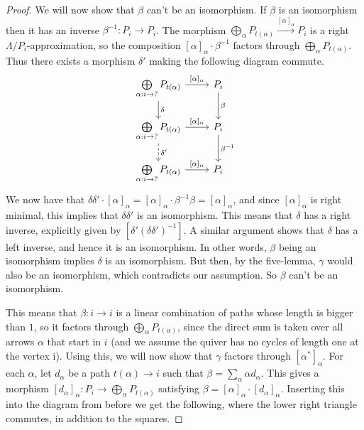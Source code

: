 \documentclass[12pt, dvipsnames, oneside]{amsart}
\theoremstyle{definition}
\begin{document}
\begin{proof}
We will now show that $\beta$ can't be an isomorphism. If $\beta$ is an isomorphism then it has an inverse $\beta^{-1}\colon P_i\rightarrow P_i$.
The morphism $\bigoplus_{\alpha}P_{t(\alpha)} \xrightarrow{[\alpha]_{\alpha}} P_i$ is a right $\Lambda/P_i$-approximation, so the composition $[\alpha]_\alpha\cdot\beta^{-1}$ factors through $\bigoplus_{\alpha}P_{t(\alpha)}$. Thus there exists a morphism $\delta'$ making the following diagram commute.
\begin{equation*}
\begin{tikzcd}
\bigoplus\limits_{\alpha:i\rightarrow ?}P_{t(\alpha)}  \arrow[r, "{[\alpha]_{\alpha}}"] \arrow[d, "{\delta}"] & P_i \arrow[d, "{\beta}"] \\
\bigoplus\limits_{\alpha:i\rightarrow ?}P_{t(\alpha)}  \arrow[r, "{[\alpha]_{\alpha}}"] \arrow[d, dashed, "{\delta'}"] & P_i \arrow[d, "{\beta^{-1}}"] \\
\bigoplus\limits_{\alpha:i\rightarrow ?} P_{t(\alpha)}  \arrow[r, "{[\alpha]_{\alpha}}"] & P_i
\end{tikzcd}
\end{equation*}
We now have that $\delta\delta'\cdot[\alpha]_\alpha=[\alpha]_\alpha\cdot\beta^{-1}\beta=[\alpha]_\alpha$, and since $[\alpha]_\alpha$ is right minimal, this implies that $\delta\delta'$ is an isomorphism. 
This means that $\delta$ has a right inverse, explicitly given by $\left[\delta'(\delta\delta')^{-1}\right]$. 
A similar argument shows that $\delta$ has a left inverse, and hence it is an isomorphism. In other words, $\beta$ being an isomorphism implies $\delta$ is an isomorphism. But then, by the five-lemma, $\gamma$ would also be an isomorphism, which contradicts our assumption. So $\beta$ can't be an isomorphism.

\bigskip

This means that $\beta\colon i\rightarrow i$ is a linear combination of paths whose length is bigger than $1$, so it factors through $\bigoplus_{\alpha}P_{t(\alpha)} $, since the direct sum is taken over all arrows $\alpha$ that start in $i$ (and we assume the quiver has no cycles of length one at the vertex i). Using this, we will now show that $\gamma$ factors through $[\alpha^*]_{\alpha}$.
For each $\alpha$, let $d_\alpha$ be a path $t(\alpha)\rightarrow i$ such that $\beta=\sum_\alpha \alpha d_\alpha$.  This gives a morphism $[d_\alpha]_\alpha\colon P_i\rightarrow \bigoplus_\alpha P_{t(\alpha)}$ satisfying $\beta=[\alpha]_{\alpha}\cdot [d_\alpha]_\alpha$. Inserting this into the diagram from before we get the following, where the lower right triangle commutes, in addition to the squares.


\end{proof}
\end{document}
